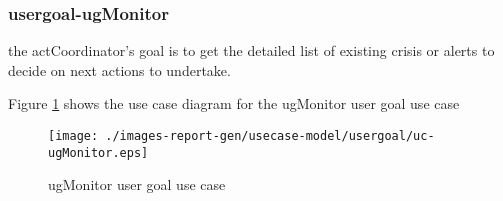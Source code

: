 \subsubsection{usergoal-ugMonitor}

\label{RE-use-case-ugMonitor}



the actCoordinator's goal is to get the detailed list of existing crisis or alerts to decide on next actions to undertake. 


\begin{usecase}
  











\end{usecase} 


Figure \ref{fig:ru.iu.bachelor.sed.group01.icrash-RE-UCD-uc-ugMonitor}
shows the use case diagram for the ugMonitor user goal use case

\begin{figure}[htbp]
\begin{center}

\texttt{[image: ./images-report-gen/usecase-model/usergoal/uc-ugMonitor.eps]}
\end{center}
\caption[ru.iu.bachelor.sed.group01.icrash Use Case Diagram: uc-ugMonitor]{ ugMonitor user goal use case}
\label{fig:ru.iu.bachelor.sed.group01.icrash-RE-UCD-uc-ugMonitor}
\end{figure}
\vspace{0.5cm}
